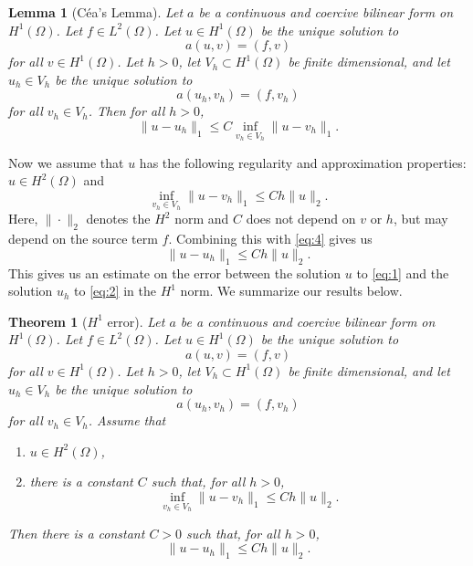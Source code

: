 \documentclass{article}
\theoremstyle{plain}
\newtheorem{theorem}{Theorem}
\newtheorem{lemma}{Lemma}
\begin{document}
\begin{lemma}[C\'ea's Lemma]
	Let $a$ be a continuous and coercive bilinear form on $H^1(\Omega)$.
	Let $f \in L^2(\Omega)$.
	Let $u \in H^1(\Omega)$ be the unique solution to
	\[a(u,v) = (f,v)\]
	for all $v\in H^1(\Omega)$.
	Let $h > 0$, let $V_h \subset H^1(\Omega)$ be finite dimensional, and let $u_h \in V_h$ be the unique solution to
	\[a(u_h,v_h) = (f,v_h)\]
	for all $v_h \in V_h$.
	Then for all $h > 0$,
	\begin{equation}
		\|u-u_h\|_1 \leq C\inf_{v_h\in V_h}\|u-v_h\|_1.
	\end{equation}
\end{lemma}

Now we assume that $u$ has the following regularity and approximation properties: $u \in H^2(\Omega)$ and
\begin{equation}\label{eq:8}
	\inf_{v_h\in V_h}\|u-v_h\|_1 \leq Ch\|u\|_2.
\end{equation}
Here, $\|\cdot\|_2$ denotes the $H^2$ norm and $C$ does not depend on $v$ or $h$, but may depend on the source term $f$.
Combining this with \eqref{eq:4} gives us
\begin{equation}
	\|u-u_h\|_1 \leq Ch\|u\|_2.
\end{equation}
This gives us an estimate on the error between the solution $u$ to \eqref{eq:1} and the solution $u_h$ to \eqref{eq:2} in the $H^1$ norm.
We summarize our results below.
\begin{theorem}[$H^1$ error]
	Let $a$ be a continuous and coercive bilinear form on $H^1(\Omega)$.
	Let $f \in L^2(\Omega)$.
	Let $u \in H^1(\Omega)$ be the unique solution to
	\[a(u,v) = (f,v)\]
	for all $v\in H^1(\Omega)$.
	Let $h > 0$, let $V_h \subset H^1(\Omega)$ be finite dimensional, and let $u_h \in V_h$ be the unique solution to
	\[a(u_h,v_h) = (f,v_h)\]
	for all $v_h \in V_h$.
	Assume that
	\begin{enumerate}
		\item $u \in H^2(\Omega)$,
		\item there is a constant $C$ such that, for all $h > 0$,
		      \[\inf_{v_h\in V_h}\|u-v_h\|_1 \leq Ch\|u\|_2.\]
	\end{enumerate}
	Then there is a constant $C > 0$ such that, for all $h > 0$,
	\begin{equation}\label{eq:6}
		\|u-u_h\|_1 \leq Ch\|u\|_2.
	\end{equation}
\end{theorem}
\end{document}
